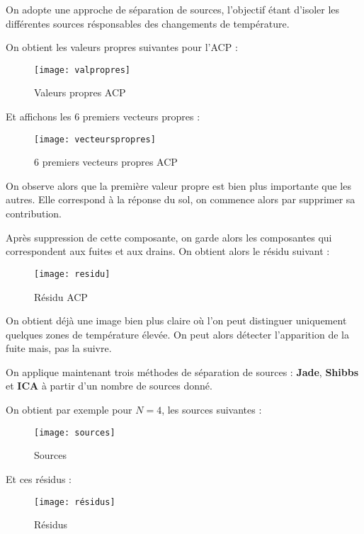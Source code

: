 \documentclass[12pt,a4paper,titlepage]{scrartcl}
\begin{document}
On adopte une approche de séparation de sources, l'objectif étant d'isoler les différentes
sources résponsables des changements de température.

On obtient les valeurs propres suivantes pour l'ACP :

\begin{figure}[H]
    \caption{Valeurs propres ACP}
    \texttt{[image: valpropres]}
    \centering
\end{figure}

Et affichons les 6 premiers vecteurs propres :

\begin{figure}[H]
    \caption{6 premiers vecteurs propres ACP}
    \texttt{[image: vecteurspropres]}
    \centering
\end{figure}

On observe alors que la première valeur propre est bien plus importante que les autres. Elle
correspond à la réponse du sol, on commence alors par supprimer sa contribution.

Après suppression de cette composante, on garde alors les composantes qui correspondent
aux fuites et aux drains. On obtient alors le résidu suivant :

\begin{figure}[H]
    \caption{Résidu ACP}
    \texttt{[image: residu]}
    \centering
\end{figure}

On obtient déjà une image bien plus claire où l'on peut distinguer uniquement quelques
zones de température élevée. On peut alors détecter l'apparition de la fuite mais, pas
la suivre.

On applique maintenant trois méthodes de séparation de sources : \textbf{Jade}, \textbf{Shibbs} et \textbf{ICA} à partir
d'un nombre de sources donné.

On obtient par exemple pour $N = 4$, les sources suivantes :

\begin{figure}[H]
    \caption{Sources}
    \label{fig:sources4}
    \texttt{[image: sources]}
    \centering
\end{figure}

Et ces résidus :

\begin{figure}[H]
    \caption{Résidus}
    \texttt{[image: résidus]}
    \centering
\end{figure}
\end{document}
